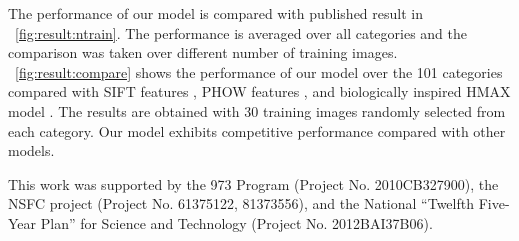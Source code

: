 \documentclass{ecai2014}
\begin{document}
The performance of our model is compared with published result
in \figurename~\ref{fig:result:ntrain}.
The performance is averaged over all categories and
the comparison was taken over different number of training images.
\figurename~\ref{fig:result:compare} shows
the performance of our model over the 101 categories
compared with SIFT features \cite{Lowe1999},
PHOW features \cite{Lazebnik2006},
and biologically inspired HMAX model \cite{Serre2007}.
The results are obtained with 30 training images randomly selected from each category.
Our model exhibits competitive performance compared with other models.

\ack This work was supported by the 973 Program (Project No. 2010CB327900), 
the NSFC project (Project No. 61375122, 81373556), 
and the National ``Twelfth Five-Year Plan'' for Science and Technology (Project No. 2012BAI37B06).


\end{document}

